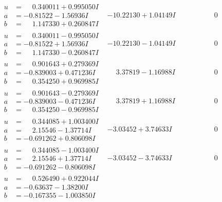 \documentclass[1p]{elsarticle_modified}
\theoremstyle{definition}
\begin{document}
$$\begin{array}{c|c|c}
\begin{aligned}
u &= \phantom{-}0.340011 + 0.995050 I \\
a &= -0.81522 - 1.56936 I \\
b &= \phantom{-}1.147330 + 0.260847 I\end{aligned}
 & -10.22130 + 1.04149 I & \phantom{-0.000000 } 0 \\ \hline\begin{aligned}
u &= \phantom{-}0.340011 - 0.995050 I \\
a &= -0.81522 + 1.56936 I \\
b &= \phantom{-}1.147330 - 0.260847 I\end{aligned}
 & -10.22130 - 1.04149 I & \phantom{-0.000000 } 0 \\ \hline\begin{aligned}
u &= \phantom{-}0.901643 + 0.279369 I \\
a &= -0.839003 + 0.471236 I \\
b &= \phantom{-}0.354250 + 0.969985 I\end{aligned}
 & \phantom{-}3.37819 - 1.16988 I & \phantom{-0.000000 } 0 \\ \hline\begin{aligned}
u &= \phantom{-}0.901643 - 0.279369 I \\
a &= -0.839003 - 0.471236 I \\
b &= \phantom{-}0.354250 - 0.969985 I\end{aligned}
 & \phantom{-}3.37819 + 1.16988 I & \phantom{-0.000000 } 0 \\ \hline\begin{aligned}
u &= \phantom{-}0.344085 + 1.003400 I \\
a &= \phantom{-}2.15546 - 1.37714 I \\
b &= -0.691262 + 0.806098 I\end{aligned}
 & -3.03452 + 3.74633 I & \phantom{-0.000000 } 0 \\ \hline\begin{aligned}
u &= \phantom{-}0.344085 - 1.003400 I \\
a &= \phantom{-}2.15546 + 1.37714 I \\
b &= -0.691262 - 0.806098 I\end{aligned}
 & -3.03452 - 3.74633 I & \phantom{-0.000000 } 0 \\ \hline\begin{aligned}
u &= \phantom{-}0.526490 + 0.922044 I \\
a &= -0.63637 - 1.38200 I \\
b &= -0.167355 - 1.003850 I\end{aligned}

\end{array}$$
\end{document}
